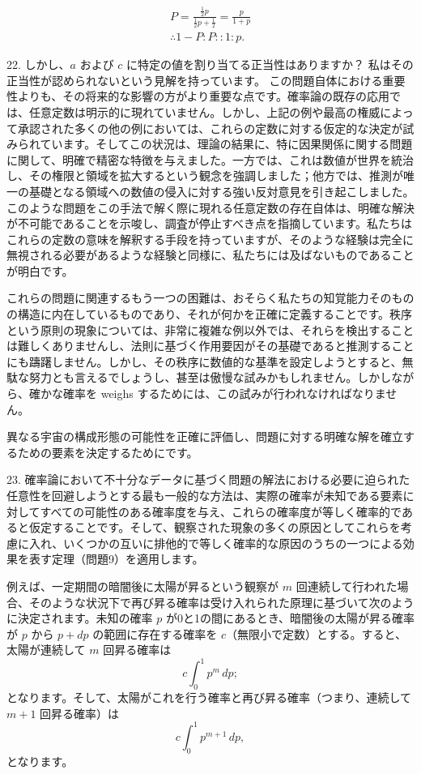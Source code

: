 \documentclass[a4paper,11pt,openany]{ltjsbook}
\begin{document}
\begin{gather*}
  P = \frac{\frac{1}{2}p}{\frac{1}{2}p + \frac{1}{2}} = \frac{p}{1+p}   \\
  \therefore 1 - P \colon P \colon\colon 1 \colon p.    \tag{6}
\end{gather*}

22. しかし、$a$ および $c$ に特定の値を割り当てる正当性はありますか？
私はその正当性が認められないという見解を持っています。
この問題自体における重要性よりも、その将来的な影響の方がより重要な点です。確率論の既存の応用では、任意定数は明示的に現れていません。しかし、上記の例や最高の権威によって承認された多くの他の例においては、これらの定数に対する仮定的な決定が試みられています。そしてこの状況は、理論の結果に、特に因果関係に関する問題に関して、明確で精密な特徴を与えました。一方では、これは数値が世界を統治し、その権限と領域を拡大するという観念を強調しました；他方では、推測が唯一の基礎となる領域への数値の侵入に対する強い反対意見を引き起こしました。このような問題をこの手法で解く際に現れる任意定数の存在自体は、明確な解決が不可能であることを示唆し、調査が停止すべき点を指摘しています。私たちはこれらの定数の意味を解釈する手段を持っていますが、そのような経験は完全に無視される必要があるような経験と同様に、私たちには及ばないものであることが明白です。

これらの問題に関連するもう一つの困難は、おそらく私たちの知覚能力そのものの構造に内在しているものであり、それが何かを正確に定義することです。秩序という原則の現象については、非常に複雑な例以外では、それらを検出することは難しくありませんし、法則に基づく作用要因がその基礎であると推測することにも躊躇しません。しかし、その秩序に数値的な基準を設定しようとすると、無駄な努力とも言えるでしょうし、甚至は傲慢な試みかもしれません。しかしながら、確かな確率を weighs するためには、この試みが行われなければなりません。

異なる宇宙の構成形態の可能性を正確に評価し、問題に対する明確な解を確立するための要素を決定するためにです。

23. 確率論において不十分なデータに基づく問題の解法における必要に迫られた任意性を回避しようとする最も一般的な方法は、実際の確率が未知である要素に対してすべての可能性のある確率度を与え、これらの確率度が等しく確率的であると仮定することです。そして、観察された現象の多くの原因としてこれらを考慮に入れ、いくつかの互いに排他的で等しく確率的な原因のうちの一つによる効果を表す定理（問題9）を適用します。

例えば、一定期間の暗闇後に太陽が昇るという観察が $m$ 回連続して行われた場合、そのような状況下で再び昇る確率は受け入れられた原理に基づいて次のように決定されます。未知の確率 $p$ が0と1の間にあるとき、暗闇後の太陽が昇る確率が $p$ から $p + dp$ の範囲に存在する確率を $c$（無限小で定数）とする。すると、太陽が連続して $m$ 回昇る確率は
\[
  c \int_0^1 p^m \, dp;
\]
となります。そして、太陽がこれを行う確率と再び昇る確率（つまり、連続して $m + 1$ 回昇る確率）は
\[
  c \int_0^1 p^{m+1} \, dp,
\]
となります。
\end{document}
